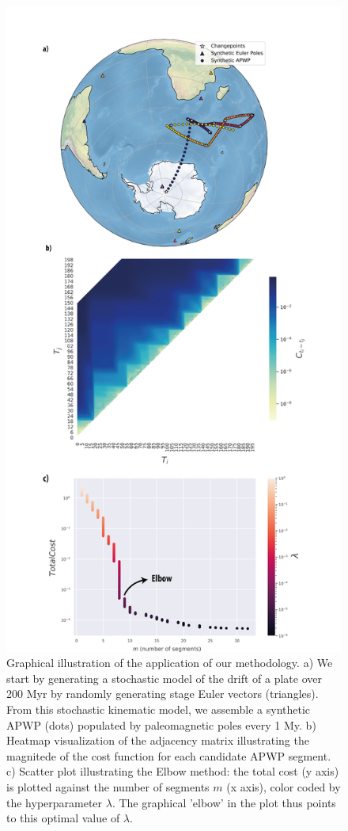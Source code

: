 \documentclass{article} %
\begin{document}
\begin{figure}
\begin{centering}
\includegraphics[scale=0.4]{Figure 4.png}

\caption{\small Graphical illustration of the application of our methodology. a) We start by generating a stochastic model of the drift of a plate over 200 Myr by randomly generating stage Euler vectors (triangles). From this stochastic kinematic model, we assemble a synthetic APWP (dots) populated by paleomagnetic poles every 1 My. b) Heatmap visualization of the adjacency matrix illustrating the magnitede of the cost function for each candidate APWP segment. c) Scatter plot illustrating the Elbow method: the total cost (y axis) is plotted against the number of segments $m$ (x axis), color coded by the hyperparameter $\lambda$. The graphical 'elbow' in the plot thus points to this optimal value of $\lambda$.}

\label{fig:figure4}
\end{centering}
\end{figure}
\end{document}
